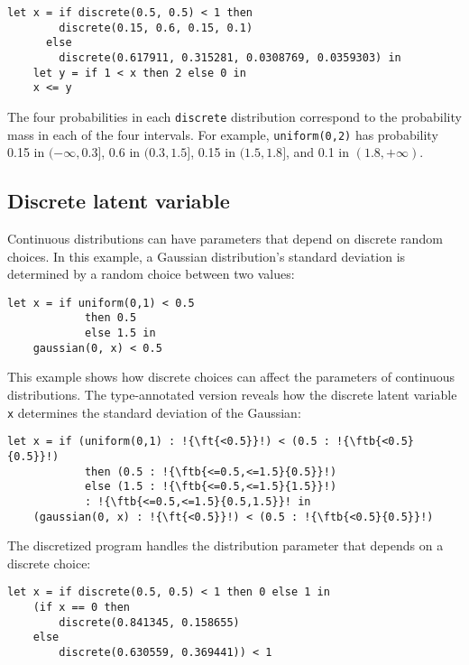 \begin{lstlisting}[aboveskip=1em,belowskip=1em]
    let x = if discrete(0.5, 0.5) < 1 then
        discrete(0.15, 0.6, 0.15, 0.1)
      else
        discrete(0.617911, 0.315281, 0.0308769, 0.0359303) in
    let y = if 1 < x then 2 else 0 in
    x <= y
\end{lstlisting}

\noindent The four probabilities in each \texttt{discrete} distribution correspond to the probability mass in each of the four intervals. For example, \texttt{uniform(0,2)} has probability 0.15 in $(-\infty, 0.3]$, 0.6 in $(0.3, 1.5]$, 0.15 in $(1.5, 1.8]$, and 0.1 in $(1.8, +\infty)$.

\subsection{Discrete latent variable}

Continuous distributions can have parameters that depend on discrete random choices. In this example, a Gaussian distribution's standard deviation is determined by a random choice between two values:

\begin{lstlisting}[aboveskip=1em,belowskip=1em,escapechar=!]
    let x = if uniform(0,1) < 0.5 
            then 0.5
            else 1.5 in
    gaussian(0, x) < 0.5
\end{lstlisting}

\noindent This example shows how discrete choices can affect the parameters of continuous distributions. The type-annotated version reveals how the discrete latent variable \texttt{x} determines the standard deviation of the Gaussian:

\begin{lstlisting}[aboveskip=1em,belowskip=1em,escapechar=!]
    let x = if (uniform(0,1) : !{\ft{<0.5}}!) < (0.5 : !{\ftb{<0.5}{0.5}}!)
            then (0.5 : !{\ftb{<=0.5,<=1.5}{0.5}}!)
            else (1.5 : !{\ftb{<=0.5,<=1.5}{1.5}}!)
            : !{\ftb{<=0.5,<=1.5}{0.5,1.5}}! in
    (gaussian(0, x) : !{\ft{<0.5}}!) < (0.5 : !{\ftb{<0.5}{0.5}}!)
\end{lstlisting}

\noindent The discretized program handles the distribution parameter that depends on a discrete choice:

\begin{lstlisting}[aboveskip=1em,belowskip=1em]
    let x = if discrete(0.5, 0.5) < 1 then 0 else 1 in
    (if x == 0 then
        discrete(0.841345, 0.158655)
    else
        discrete(0.630559, 0.369441)) < 1
\end{lstlisting}

